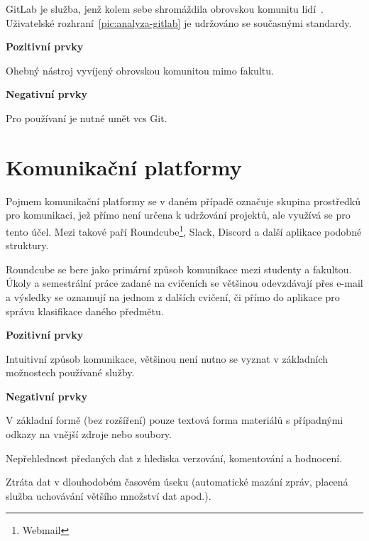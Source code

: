 GitLab je služba, jenž kolem sebe shromáždila obrovskou komunitu lidí~\cite{gitlabSource}. Uživatelské rozhraní~\ref{pic:analyza-gitlab} je udržováno se současnými standardy.

\textbf{Pozitivní prvky}
\begin{ul}
\tightlist
   \item Ohebný nástroj vyvíjený obrovskou komunitou mimo fakultu.
\end{ul}

\textbf{Negativní prvky}
\begin{ul}
   \item Pro používaní je nutné umět \gls{vcs} Git.
\end{ul}




\section{Komunikační platformy}

Pojmem komunikační platformy se v daném případě označuje skupina prostředků pro komunikaci, jež přímo není určena k udržování projektů, ale využívá se pro tento účel. Mezi takové paří Roundcube\footnote{Webmail}, Slack, Discord a další aplikace podobné struktury.

Roundcube se bere jako primární způsob komunikace mezi studenty a fakultou. Úkoly a semestrální práce zadané na cvičeních se většinou odevzdávají přes e-mail a výsledky se oznamují na jednom z dalších cvičení, či přímo do aplikace pro správu klasifikace daného předmětu.

\textbf{Pozitivní prvky}
\begin{ul}
   \item Intuitivní způsob komunikace, většinou není nutno se vyznat v základních možnostech používané služby.
\end{ul}

\textbf{Negativní prvky}
\begin{ul}
   \item V základní formě (bez rozšíření) pouze textová forma materiálů s případnými odkazy na vnější zdroje nebo soubory.
   \item Nepřehlednost předaných dat z hlediska verzování, komentování a hodnocení.
   \item Ztráta dat v dlouhodobém časovém úseku (automatické mazání zpráv, placená služba uchovávání většího množství dat apod.).
\end{ul}


